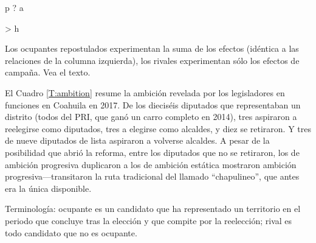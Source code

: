 \documentclass[letter,12pt]{article}
\newcommand{\mc}{\multicolumn}
\begin{document}
p ? a

> h

Los ocupantes repostulados experimentan la suma de los efectos (idéntica a las relaciones de la columna izquierda), los rivales experimentan sólo los efectos de campaña. Vea el texto.




El Cuadro \ref{T:ambition} resume la ambición revelada por los legisladores en funciones en Coahuila en 2017. De los dieciséis diputados que representaban un distrito (todos del PRI, que ganó un carro completo en 2014), tres aspiraron a reelegirse como diputados, tres a elegirse como alcaldes, y diez se retiraron. Y tres de nueve diputados de lista aspiraron a volverse alcaldes. A pesar de la posibilidad que abrió la reforma, entre los diputados que no se retiraron, los de ambición progresiva duplicaron a los de ambición estática mostraron ambición progresiva---transitaron la ruta tradicional del llamado ``chapulineo'', que antes era la única disponible.

Terminología: ocupante es un candidato que ha representado un territorio en el periodo que concluye tras la elección y que compite por la reelección; rival es todo candidato que no es ocupante.  



\end{document}
